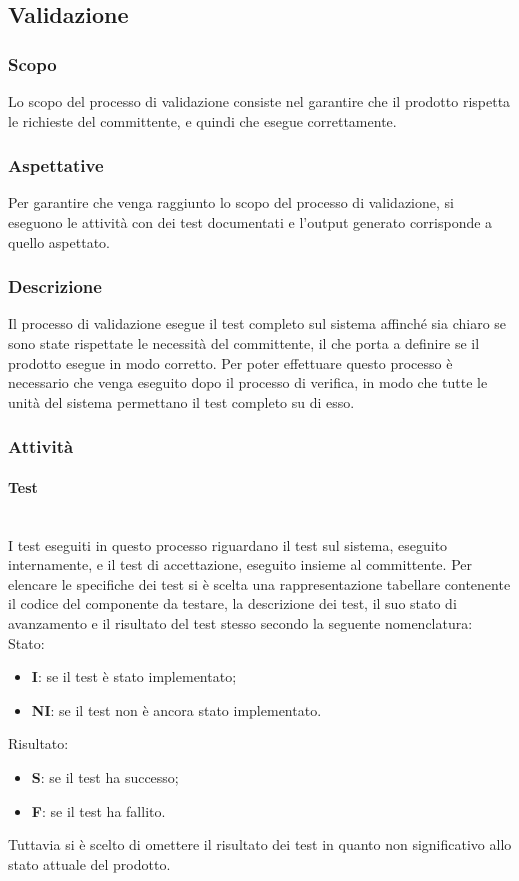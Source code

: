 \subsection{Validazione}

	\subsubsection{Scopo}
		Lo scopo del processo di validazione consiste nel garantire che il prodotto rispetta le richieste del committente, e quindi che esegue correttamente.
	\subsubsection{Aspettative}
		Per garantire che venga raggiunto lo scopo del processo di validazione, si eseguono le attività con dei test documentati e l'output generato corrisponde a quello aspettato.
	\subsubsection{Descrizione}
		Il processo di validazione esegue il test completo sul sistema affinché sia chiaro se sono state rispettate le necessità del committente, il che porta a definire se il prodotto esegue in modo corretto. Per poter effettuare questo processo è necessario che venga eseguito dopo il processo di verifica, in modo che tutte le unità del sistema permettano il test completo su di esso. 
	\subsubsection{Attività}
		\paragraph{Test}\mbox{}\\
			I test eseguiti in questo processo riguardano il test sul sistema, eseguito internamente, e il test di accettazione, eseguito insieme al committente.
			Per elencare le specifiche dei test si è scelta una rappresentazione tabellare contenente il codice del componente da testare, la descrizione dei test, il suo stato di avanzamento e il risultato del test stesso secondo la seguente nomenclatura: \\
                Stato:
                \begin{itemize}
                    \item \textbf{I}: se il test è stato implementato;
                    \item \textbf{NI}: se il test non è ancora stato implementato.     
                \end{itemize}
                Risultato:
                \begin{itemize}
                    \item \textbf{S}: se il test ha successo;
                    \item \textbf{F}: se il test ha fallito.
                \end{itemize}
                Tuttavia si è scelto di omettere il risultato dei test in quanto non significativo allo stato attuale del prodotto.

